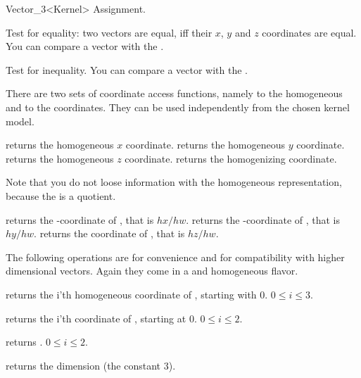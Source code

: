 \begin{ccRefClass} {Vector_3<Kernel>}
\ccHidden {}
        {Assignment.}

       {Test for equality: two vectors are equal, iff their $x$, $y$ 
        and $z$ coordinates are equal. You can compare a vector with the
        .}

       {Test for inequality. You can compare a vector with the
        .}

There are two sets of coordinate access functions, namely to the
homogeneous and to the  coordinates. They can be used
independently from the chosen kernel model.

       {returns the homogeneous $x$ coordinate.}
\ccGlue
{}
       {returns the homogeneous $y$ coordinate.}
\ccGlue
{}
       {returns the homogeneous $z$ coordinate.}
\ccGlue
{}
       {returns the homogenizing  coordinate.}

Note that you do not loose information with the homogeneous
representation, because the  is a quotient.

       {returns the -coordinate of \ccVar, that is $hx/hw$.}
\ccGlue
{}
       {returns the -coordinate of \ccVar, that is $hy/hw$.}
\ccGlue
{}
       {returns the  coordinate of \ccVar, that is $hz/hw$.}

The following operations are for convenience and for compatibility
with higher dimensional vectors.  Again they come in a
 and homogeneous flavor.

       {returns the i'th homogeneous coordinate of \ccVar, starting with 0.
        \ccPrecond $0\leq i \leq 3$.}

       {returns the i'th  coordinate of \ccVar, starting at 0.
        \ccPrecond $0\leq i \leq 2$.}

       {returns  .
        \ccPrecond $0\leq i \leq 2$.}

       {returns the dimension (the constant 3).}


\end{ccRefClass}
